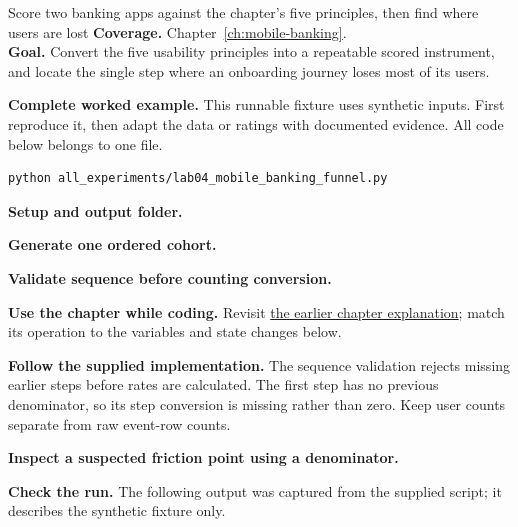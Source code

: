 
\begin{labproject}{Score two banking apps against the chapter's five principles, then find where users are lost}
\textbf{Coverage.} Chapter~\ref{ch:mobile-banking}.\\
\textbf{Goal.} Convert the five usability principles into a repeatable scored instrument, and locate the single step where an onboarding journey loses most of its users.




\end{labproject}

\textbf{Complete worked example.} This runnable fixture uses synthetic inputs. First reproduce it, then adapt the data or ratings with documented evidence. All code below belongs to one file.
\begin{lstlisting}[style=utpterminal]
python all_experiments/lab04_mobile_banking_funnel.py
\end{lstlisting}

\noindent\textbf{Setup and output folder.}


\noindent\textbf{Generate one ordered cohort.}


\noindent\textbf{Validate sequence before counting conversion.}



\textbf{Use the chapter while coding.} Revisit \hyperref[ch:mobile-banking]{the earlier chapter explanation}; match its operation to the variables and state changes below.

\textbf{Follow the supplied implementation.} The sequence validation rejects missing earlier steps before rates are calculated. The first step has no previous denominator, so its step conversion is missing rather than zero. Keep user counts separate from raw event-row counts.




\noindent\textbf{Inspect a suspected friction point using a denominator.}


\textbf{Check the run.} The following output was captured from the supplied script; it describes the synthetic fixture only.



